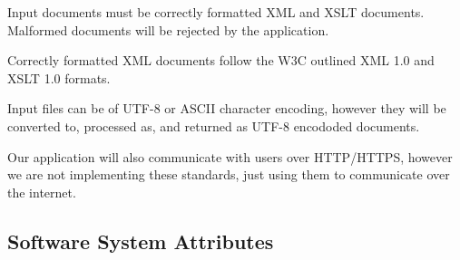 Input documents must be correctly formatted XML and XSLT documents.
Malformed documents will be rejected by the application.

Correctly formatted XML documents follow the W3C outlined XML 1.0 and XSLT 1.0 formats. \cite{xml-spec} \cite{xslt-spec}

Input files can be of UTF-8 or ASCII character encoding, however they will be converted to, processed as, and returned as UTF-8 encododed documents.

Our application will also communicate with users over HTTP/HTTPS, however we are not implementing these standards, just using them to communicate over the internet.


\subsection{Software System Attributes}

